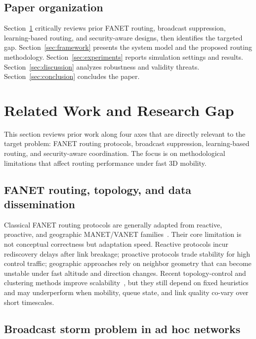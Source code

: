 \documentclass[5p,times]{elsarticle}
\begin{document}
\subsection{Paper organization}

Section~\ref{sec:related} critically reviews prior FANET routing, broadcast suppression, learning-based routing, and security-aware designs, then identifies the targeted gap. Section~\ref{sec:framework} presents the system model and the proposed routing methodology. Section~\ref{sec:experiments} reports simulation settings and results. Section~\ref{sec:discussion} analyzes robustness and validity threats. Section~\ref{sec:conclusion} concludes the paper.

\section{Related Work and Research Gap}
\label{sec:related}

This section reviews prior work along four axes that are directly relevant to the target problem: FANET routing protocols, broadcast suppression, learning-based routing, and security-aware coordination. The focus is on methodological limitations that affect routing performance under fast 3D mobility.

\subsection{FANET routing, topology, and data dissemination}

Classical FANET routing protocols are generally adapted from reactive, proactive, and geographic MANET/VANET families~\cite{bekmezci2013fanets,khan2020routing,lakew2020routing,oubbati2019routing}. Their core limitation is not conceptual correctness but adaptation speed. Reactive protocols incur rediscovery delays after link breakage; proactive protocols trade stability for high control traffic; geographic approaches rely on neighbor geometry that can become unstable under fast altitude and direction changes. Recent topology-control and clustering methods improve scalability~\cite{alam2022topology,salam2023cluster,nguyen2024adaptive}, but they still depend on fixed heuristics and may underperform when mobility, queue state, and link quality co-vary over short timescales.

\subsection{Broadcast storm problem in ad hoc networks}
\end{document}
